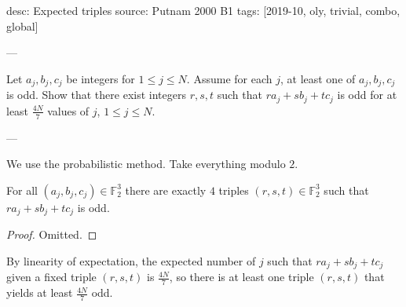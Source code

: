 desc: Expected triples
source: Putnam 2000 B1
tags: [2019-10, oly, trivial, combo, global]

---

Let $a_j,b_j,c_j$ be integers for $1\le j\le N$. Assume for each $j$, at least one of $a_j,b_j,c_j$ is odd. Show that there exist integers $r,s,t$ such that $ra_j+sb_j+tc_j$ is odd for at least $\tfrac{4N}7$ values of $j$, $1\le j\le N$.

---

We use the probabilistic method. Take everything modulo $2$.
\begin{iclaim*}
    For all $(a_j,b_j,c_j)\in\mathbb F_2^3$ there are exactly $4$ triples $(r,s,t)\in\mathbb F_2^3$ such that $ra_j+sb_j+tc_j$ is odd.
\end{iclaim*}
\begin{proof}
    Omitted.
\end{proof}

By linearity of expectation, the expected number of $j$ such that $ra_j+sb_j+tc_j$ given a fixed triple $(r,s,t)$ is $\tfrac{4N}7$, so there is at least one triple $(r,s,t)$ that yields at least $\tfrac{4N}7$ odd.
